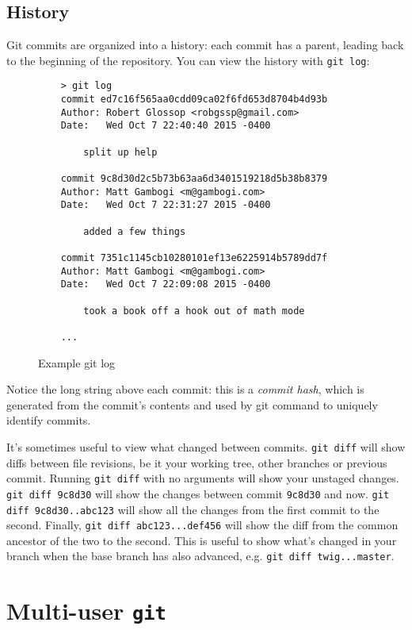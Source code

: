 \documentclass[11pt]{report}
\begin{document}
\section{History}

Git commits are organized into a history: each commit has a parent,
leading back to the beginning of the repository. You can view the
history with \texttt{git log}:

\begin{figure}[H]
  \caption{Example git log}
  \begin{lstlisting}
    > git log
    commit ed7c16f565aa0cdd09ca02f6fd653d8704b4d93b
    Author: Robert Glossop <robgssp@gmail.com>
    Date:   Wed Oct 7 22:40:40 2015 -0400
    
        split up help
    
    commit 9c8d30d2c5b73b63aa6d3401519218d5b38b8379
    Author: Matt Gambogi <m@gambogi.com>
    Date:   Wed Oct 7 22:31:27 2015 -0400
    
        added a few things
    
    commit 7351c1145cb10280101ef13e6225914b5789dd7f
    Author: Matt Gambogi <m@gambogi.com>
    Date:   Wed Oct 7 22:09:08 2015 -0400
    
        took a book off a hook out of math mode

    ...
  \end{lstlisting}
\end{figure}

Notice the long string above each commit: this is a \emph{commit
  hash}, which is generated from the commit's contents and used by git
command to uniquely identify commits.

It's sometimes useful to view what changed between commits.
\texttt{git diff} will show diffs between file revisions, be it your
working tree, other branches or previous commit. Running \texttt{git
  diff} with no arguments will show your unstaged changes. \texttt{git
  diff 9c8d30} will show the changes between commit \texttt{9c8d30}
and now. \texttt{git diff 9c8d30..abc123} will show all the changes
from the first commit to the second. Finally, \texttt{git diff
  abc123...def456} will show the diff from the common ancestor of the
two to the second. This is useful to show what's changed in your
branch when the base branch has also advanced, e.g. \texttt{git diff
  twig...master}.

\chapter{Multi-user \texttt{git}}
\end{document}
